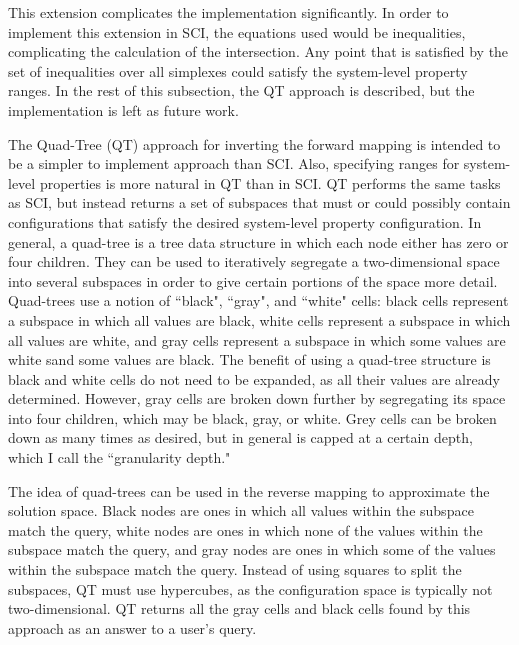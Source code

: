This extension complicates the implementation significantly.
In order to implement this extension in SCI, the equations used would be inequalities, complicating the calculation of the intersection.
Any point that is satisfied by the set of inequalities over all simplexes could satisfy the system-level property ranges.
In the rest of this subsection, the QT approach is described, but the implementation is left as future work.

The Quad-Tree (QT) approach for inverting the forward mapping is intended to be a simpler to implement approach than SCI.
Also, specifying ranges for system-level properties is more natural in QT than in SCI.
QT performs the same tasks as SCI, but instead returns a set of subspaces that must or could possibly contain configurations that satisfy the desired system-level property configuration.
In general, a quad-tree is a tree data structure in which each node either has zero or four children.
They can be used to iteratively segregate a two-dimensional space into several subspaces in order to give certain portions of the space more detail.
Quad-trees use a notion of ``black", ``gray", and ``white" cells: black cells represent a subspace in which all values are black, white cells represent a subspace in which all values are white, and gray cells represent a subspace in which some values are white sand some values are black.
The benefit of using a quad-tree structure is black and white cells do not need to be expanded, as all their values are already determined.
However, gray cells are broken down further by segregating its space into four children, which may be black, gray, or white.
Grey cells can be broken down as many times as desired, but in general is capped at a certain depth, which I call the ``granularity depth."

The idea of quad-trees can be used in the reverse mapping to approximate the solution space.
Black nodes are ones in which all values within the subspace match the query,
white nodes are ones in which none of the values within the subspace match the query,
and gray nodes are ones in which some of the values within the subspace match the query.
Instead of using squares to split the subspaces, QT must use hypercubes, as the configuration space is typically not two-dimensional.
QT returns all the gray cells and black cells found by this approach as an answer to a user's query.

